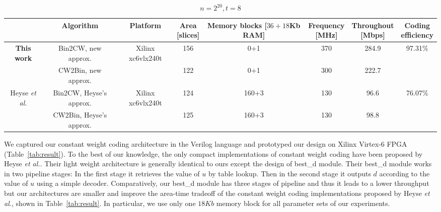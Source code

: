 \documentclass[10pt,journal,compsoc]{IEEEtran}
\begin{document}
\begin{table}[!htb]
\begin{subtable}[t]{0.95\linewidth}\centering
    \caption{$n=2^{20}, t=8$}
    \begin{tabular}{cccccccc}\hline
    &   Algorithm & Platform & \tabincell{c}{Area\\{}[slices]} & \tabincell{c}{Memory blocks\\{}[$36+18$Kb RAM]} & \tabincell{c}{Frequency\\{}[MHz]} & \tabincell{c}{Throughout\\{}[Mbps]} & \tabincell{c}{Coding\\efficiency}\\
    \hline
     \multirow{2}{*}{\textbf{This work}} & Bin2CW, new approx. & \multirow{2}{*}{Xilinx xc6vlx240t} & 156 & 0+1 & 370 & 284.9 &\multirow{2}{*}{97.31\%}\\
                                        & CW2Bin, new approx. &  & 122 & 0+1 & 300 & 222.7 & \\

    \hline
    \multirow{2}{*}{Heyse \textit{et al.}\cite{heyse2012towards}} & Bin2CW, Heyse's approx. & \multirow{2}{*}{Xilinx xc6vlx240t} & 124 & 160+3 & 130&96.6 & \multirow{2}{*}{76.07\%}\\
                                        & CW2Bin, Heyse's approx. & & 125 & 160+3 & 130& 98.8 &\\

    \hline
    \end{tabular}
\end{subtable}
\end{table}

We captured our constant weight coding architecture in the Verilog language and prototyped our design on Xilinx Virtex-6 FPGA (Table~\ref{tab:result}).
To the best of our knowledge, the only compact implementations of constant weight coding have been proposed by Heyse \textit{et al.}\cite{heyse2012towards}.
Their light weight architecture is generally identical to ours except the design of best\_d module. Their best\_d module works in two pipeline stages:
In the first stage it retrieves the value of $u$ by table lookup. Then in the second stage it outputs $d$ according to the value of $u$ using
a simple decoder. Comparatively, our best\_d module has three stages of pipeline and thus it leads to
a lower throughput but our architectures are smaller and improve the area-time tradeoff of the constant weight coding implementations proposed
by Heyse \textit{et al.}\cite{heyse2012towards}, shown in Table~\ref{tab:result}. In particular, we use only one $18Kb$ memory block
for all parameter sets of our experiments.
\end{document}
